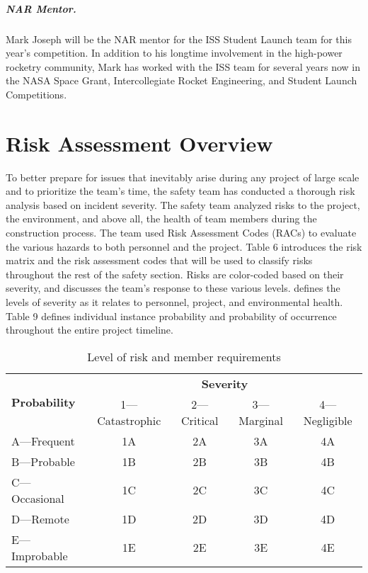 \paragraph{NAR Mentor.}

Mark Joseph will be the NAR mentor for the ISS Student Launch team for this year's competition. In addition to his longtime involvement in the high-power rocketry community, Mark has worked with the ISS team for several years now in the NASA Space Grant, Intercollegiate Rocket Engineering, and Student Launch Competitions.

\chapter{Risk Assessment Overview}

To better prepare for issues that inevitably arise during any project of large scale and to prioritize the team's time, the safety team has conducted a thorough risk analysis based on incident severity. The safety team analyzed risks to the project, the environment, and above all, the health of team members during the construction process. The team used Risk Assessment Codes (RACs) to evaluate the various hazards to both personnel and the project. Table 6 introduces the risk matrix and the risk assessment codes that will be used to classify risks throughout the rest of the safety section. Risks are color-coded based on their severity, and  discusses the team's response to these various levels.  defines the levels of severity as it relates to personnel, project, and environmental health. Table 9 defines individual instance probability and probability of occurrence throughout the entire project timeline.

\begin{table}[H]
    \centering
    \caption{Level of risk and member requirements}
    \label{tab:level of risk and member requirements}
    \begin{tabularx}{0.8\linewidth}{X c c c c}
        \toprule
       \multirow{2}{*}{\textbf{Probability}} & \multicolumn{4}{c}{\textbf{Severity}} \\
       \cmidrule(l){2-5}
        & 1---Catastrophic & 2---Critical & 3---Marginal & 4---Negligible \\
       \midrule
       A---Frequent & \cellcolor{red!25} 1A & \cellcolor{red!25} 2A & \cellcolor{orange!25} 3A & \cellcolor{green!25} 4A \\
       B---Probable & \cellcolor{red!25} 1B & \cellcolor{red!25} 2B & \cellcolor{orange!25} 3B & \cellcolor{green!25} 4B \\
       C---Occasional & \cellcolor{red!25} 1C & \cellcolor{orange!25} 2C & \cellcolor{orange!25} 3C & 4C \\
       D---Remote & \cellcolor{orange!25} 1D & \cellcolor{orange!25} 2D & \cellcolor{green!25} 3D & 4D \\
       E---Improbable & \cellcolor{green!25} 1E & \cellcolor{green!25} 2E & \cellcolor{green!25} 3E & 4E \\
       \bottomrule
    \end{tabularx}
\end{table}